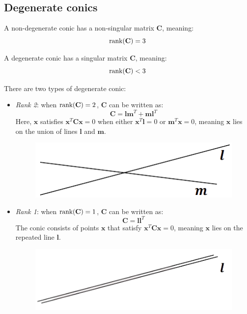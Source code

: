 \subsection{Degenerate conics}
\begin{definition}
    A non-degenerate conic has a non-singular matrix $\mathbf{C}$, meaning:
    \[\textnormal{rank}(\mathbf{C})=3\]
\end{definition}
\begin{definition}
    A degenerate conic has a singular matrix $\mathbf{C}$, meaning:
    \[\textnormal{rank}(\mathbf{C}) < 3\]
\end{definition}
There are two types of degenerate conic: 
\begin{itemize}
    \item \textit{Rank 2}: when $\textnormal{rank}(\mathbf{C}) = 2$, $\mathbf{C}$ can be written as:
        \[\mathbf{C}=\mathbf{lm}^T+\mathbf{ml}^T\]
        Here, $\mathbf{x}$ satisfies $\mathbf{x}^T \mathbf{Cx} = 0$ when either $\mathbf{x}^T \mathbf{l} = 0$ or $\mathbf{m}^T \mathbf{x} = 0$, meaning $\mathbf{x}$ lies on the union of lines $\mathbf{l}$ and $\mathbf{m}$.
        \begin{figure}[H]
            \centering
            \includegraphics[width=0.25\linewidth]{images/inters.png}
        \end{figure}
    \item \textit{Rank 1}: when $\textnormal{rank}(\mathbf{C}) = 1$, $\mathbf{C}$ can be written as:
        \[\mathbf{C}=\mathbf{ll}^T\]
        The conic consists of points $\mathbf{x}$ that satisfy $\mathbf{x}^T \mathbf{Cx} = 0$, meaning $\mathbf{x}$ lies on the repeated line $\mathbf{l}$.
        \begin{figure}[H]
            \centering
            \includegraphics[width=0.25\linewidth]{images/rep.png}
        \end{figure}
\end{itemize}